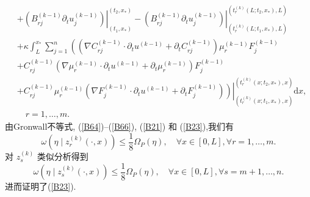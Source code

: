\documentclass[notitlepage,cs4size,punct,oneside]{ctexrep}
\numberwithin{equation}{chapter}
\theoremstyle{mystyle}
\begin{document}
\begin{align}
      & +\left.\left(B_{r j}^{(k-1)} \partial_{t} u_{j}^{(k-1)}\right)\right|_{\left(t_{1}, x_{*}\right)} ^{\left(t_{2}, x_{*}\right)}-\left.\left(B_{r j}^{(k-1)} \partial_{t} u_{j}^{(k-1)}\right)\right|_{\left(t_{r}^{(k)}\left(L ; t_{1}, x_{*}\right), L\right)} ^{\left(t_{r}^{(k)}\left(L ; t_{2}, x_{*}\right), L\right)}\nonumber \\
      & +\kappa \int_{L}^{x_{*}}\sum_{j=1}^{n}\left(\left(\nabla C_{r j}^{(k-1)} \cdot \partial_{t} u^{(k-1)} + \partial_{t} C_{r j}^{(k-1)}\right) \mu_{r}^{(k-1)} F_j^{(k-1)} \right.\nonumber                                                                                                                                            \\
      & + C_{r j}^{(k-1)}\left(\nabla \mu_{r}^{(k-1)} \cdot \partial_{t} u^{(k-1)} + \partial _{t} \mu _{r} ^{(k-1)}\right) F_j^{(k-1)}\nonumber                                                                                                                                                                                            \\
      & + \left. \left.C_{r j}^{(k-1)}\mu_{r}^{(k-1)} \left(\nabla F_{j}^{(k-1)} \cdot \partial_{t} u^{(k-1)} + \partial _{t} F_{j} ^{(k-1)}\right)\right) \right|_{\left(t_{r}^{(k)}\left(x ; t_{1}, x_{*}\right), x\right)} ^{\left(t_{r}^{(k)}\left(x ; t_{2}, x_{*}\right), x\right)} \mathrm{d} x,\nonumber                            \\& \quad r=1, \ldots, m .\label{B67}
\end{align}
由Gronwall不等式, (\ref{B64})--(\ref{B66}), (\ref{B21}) 和 (\ref{B23}),我们有
\begin{equation} \label{B68}
    \omega\left(\eta \mid z_{r}^{(k)}(\cdot, x)\right) \leq \frac{1}{8} \Omega_{P}(\eta), \quad \forall x \in[0, L], \forall r=1, \ldots, m.
\end{equation}
对 $z_{s}^{(k)}$ 类似分析得到
\begin{equation} \label{B69}
    \omega\left(\eta \mid z_{s}^{(k)}(\cdot, x)\right) \leq \frac{1}{8} \Omega_{P}(\eta), \quad \forall x \in[0, L], \forall s=m+1, \ldots, n .
\end{equation}
进而证明了(\ref{B23}).
\end{document}
